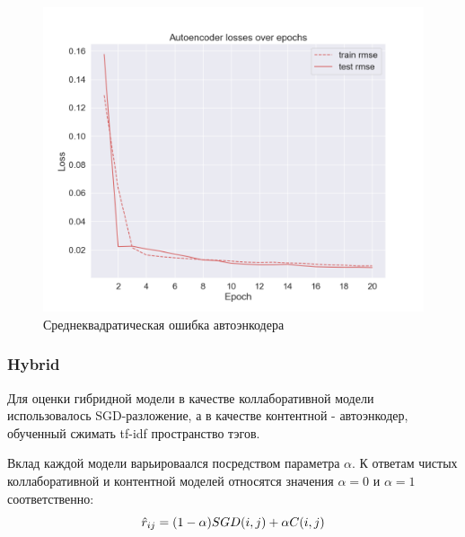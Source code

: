 \begin{figure}[h!]
\centering
\begin{minipage}{0.6\textwidth}
\centering
\includegraphics[width=0.85\linewidth]{images/content/autoencoder_losses}
\caption{Среднеквадратическая ошибка автоэнкодера}
\label{fig:autoencoder_losses}
\end{minipage}%
\end{figure}

\pagebreak

\subsubsection{Hybrid}
Для оценки гибридной модели в качестве коллаборативной модели использовалось SGD-разложение, а в качестве контентной - автоэнкодер, обученный сжимать tf-idf пространство тэгов.

Вклад каждой модели варьироваался посредством параметра $\alpha$.
К ответам чистых коллаборативной и контентной моделей относятся значения $\alpha = 0$ и $\alpha = 1$ соответственно:
\begin{equation}\label{eq:hybrid_filtering}
\hat{r}_{ij} = (1 - \alpha)\space SGD(i, j) + \alpha\space C(i, j)
\end{equation}

